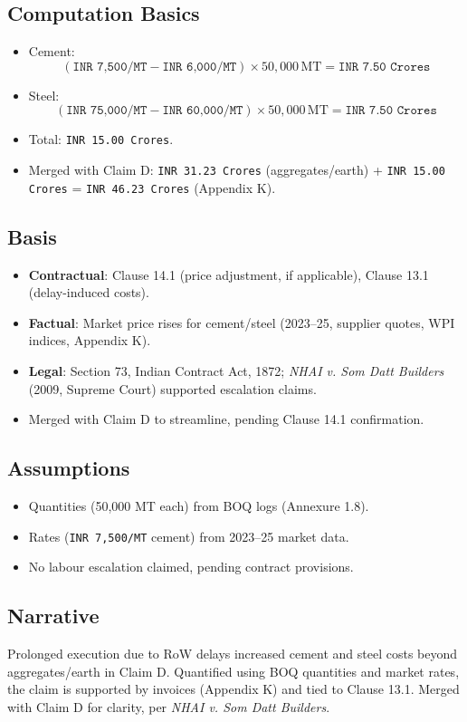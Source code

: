 \documentclass[12pt,letterpaper]{article}
\begin{document}
	\subsection*{Computation Basics}
	\begin{itemize}
		\item Cement:
		\[
		(\texttt{INR 7,500/MT} - \texttt{INR 6,000/MT}) \times 50,000 \, \text{MT} = \texttt{INR 7.50 Crores}
		\]
		\item Steel:
		\[
		(\texttt{INR 75,000/MT} - \texttt{INR 60,000/MT}) \times 50,000 \, \text{MT} = \texttt{INR 7.50 Crores}
		\]
		\item Total: \texttt{INR 15.00 Crores}.
		\item Merged with Claim D: \texttt{INR 31.23 Crores} (aggregates/earth) + \texttt{INR 15.00 Crores} = \texttt{INR 46.23 Crores} (Appendix K).
	\end{itemize}
	
	\subsection*{Basis}
	\begin{itemize}
		\item \textbf{Contractual}: Clause 14.1 (price adjustment, if applicable), Clause 13.1 (delay-induced costs).
		\item \textbf{Factual}: Market price rises for cement/steel (2023--25, supplier quotes, WPI indices, Appendix K).
		\item \textbf{Legal}: Section 73, Indian Contract Act, 1872; \textit{NHAI v. Som Datt Builders} (2009, Supreme Court) supported escalation claims.
		\item Merged with Claim D to streamline, pending Clause 14.1 confirmation.
	\end{itemize}
	
	\subsection*{Assumptions}
	\begin{itemize}
		\item Quantities (50,000 MT each) from BOQ logs (Annexure 1.8).
		\item Rates (\texttt{INR 7,500/MT} cement) from 2023--25 market data.
		\item No labour escalation claimed, pending contract provisions.
	\end{itemize}
	
	\subsection*{Narrative}
	Prolonged execution due to RoW delays increased cement and steel costs beyond aggregates/earth in Claim D. Quantified using BOQ quantities and market rates, the claim is supported by invoices (Appendix K) and tied to Clause 13.1. Merged with Claim D for clarity, per \textit{NHAI v. Som Datt Builders}.
	
\end{document}
